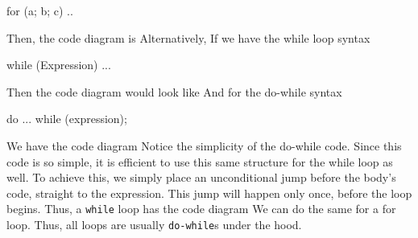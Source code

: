 \documentclass{report}
\begin{document}
\begin{itemize}
\begin{cppcode}
            for (a; b; c) ..
            \end{cppcode}
            \bigbreak \noindent 
            Then, the code diagram is 
            \bigbreak \noindent 
            \bigbreak \noindent 
            Alternatively, 
            \bigbreak \noindent 
            \bigbreak \noindent 
            If we have the while loop syntax
            \bigbreak \noindent 
            \begin{cppcode}
            while (Expression) ...
            \end{cppcode}
            \bigbreak \noindent 
            Then the code diagram would look like
            \bigbreak \noindent 
            \bigbreak \noindent 
            And for the do-while syntax
            \bigbreak \noindent 
            \begin{cppcode}
            do ... while (expression);
            \end{cppcode}
            \bigbreak \noindent 
            We have the code diagram 
            \bigbreak \noindent 
            \bigbreak \noindent 
            Notice the simplicity of the do-while code. Since this code is so simple, it is efficient to use this same structure for the while loop as well. To achieve this, we simply place an unconditional jump before the body's code, straight to the expression. This jump will happen only once, before the loop begins. Thus, a \texttt{while} loop has the code diagram
            \bigbreak \noindent 
            \bigbreak \noindent 
            We can do the same for a for loop.
            \bigbreak \noindent 
            \bigbreak \noindent 
            Thus, all loops are usually \texttt{do-while}s under the hood.




        \end{itemize}

        \pagebreak 
\end{document}
